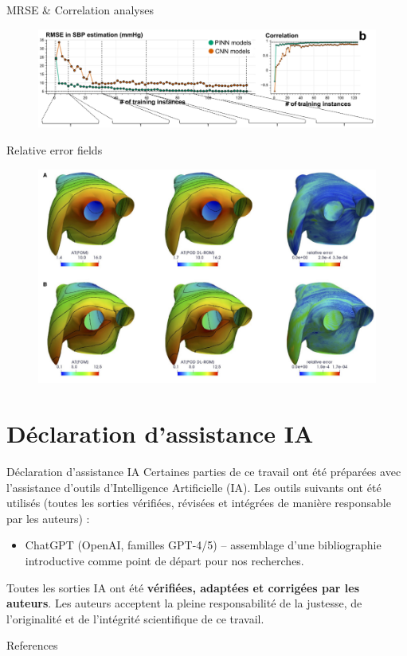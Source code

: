 \documentclass{beamer}
\begin{document}
\begin{frame}{MRSE \& Correlation analyses}
  
  \begin{figure}
      \centering
      \includegraphics[width=1\linewidth]{images/MRSE.png}
      \caption{\textcite{jafari2022}}
  \end{figure}

\end{frame}

\begin{frame}{Relative error fields}
  
  \begin{figure}
      \centering
      \includegraphics[width=0.7\linewidth]{images/err-fields.png}
      \caption{\textcite{Fresca2021}}
  \end{figure}

\end{frame}

\section*{Déclaration d'assistance IA}
\begin{frame}{Déclaration d'assistance IA}
  Certaines parties de ce travail ont été préparées avec l'assistance d'outils d'Intelligence Artificielle (IA). Les outils suivants ont été utilisés (toutes les sorties vérifiées, révisées et intégrées de manière responsable par les auteurs) :
  \begin{itemize}
    \item ChatGPT (OpenAI, familles GPT-4/5) – assemblage d'une bibliographie introductive comme point de départ pour nos recherches.
  \end{itemize}
  Toutes les sorties IA ont été \textbf{vérifiées, adaptées et corrigées par les auteurs}. Les auteurs acceptent la pleine responsabilité de la justesse, de l'originalité et de l'intégrité scientifique de ce travail.
\end{frame}

\begin{frame}[allowframebreaks]{References}
    \printbibliography
\end{frame}
\end{document}
